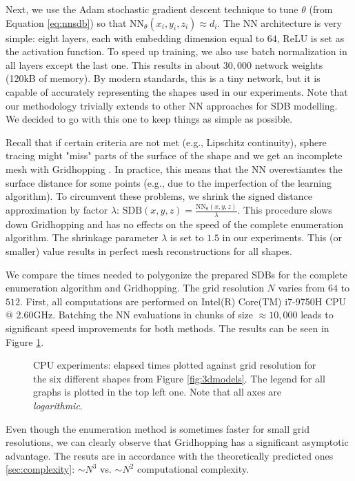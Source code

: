 \documentclass[11pt,twocolumn]{article}
\begin{document}
		Next, we use the Adam stochastic gradient descent technique to tune $\theta$ (from Equation \ref{eq:nnsdb}) so that $\text{NN}_\theta(x_i, y_i, z_i)\approx d_i$.
		The NN architecture is very simple: eight layers, each with embedding dimension equal to $64$, ReLU is set as the activation function.
		To speed up training, we also use batch normalization in all layers except the last one.
		This results in about $30,000$ network weights (120kB of memory).
		By modern standards, this is a tiny network, but it is capable of accurately representing the shapes used in our experiments.
		Note that our methodology trivially extends to other NN approaches for SDB modelling.
		We decided to go with this one to keep things as simple as possible.

		Recall that if certain criteria are not met (e.g., Lipschitz continuity),
		sphere tracing might "miss" parts of the surface of the shape and we get an incomplete mesh with Gridhopping \cite{Hart94spheretracing}.
		In practice, this means that the NN overestiamtes the surface distance for some points
		(e.g., due to the imperfection of the learning algorithm).
		To circumvent these problems, we shrink the signed distance approximation by factor $\lambda$: $\text{SDB}(x, y, z)=\frac{\text{NN}_\theta(x, y, z)}{\lambda}$.
		This procedure slows down Gridhopping and has no effects on the speed of the complete enumeration algorithm.
		The shrinkage parameter $\lambda$ is set to $1.5$ in our experiments.
		This (or smaller) value results in perfect mesh reconstructions for all shapes.

		We compare the times needed to polygonize the prepared SDBs for the complete enumeration algorithm and Gridhopping.
		The grid resolution $N$ varies from $64$ to $512$.
		First, all computations are performed on Intel(R) Core(TM) i7-9750H CPU @ 2.60GHz.
		Batching the NN evaluations in chunks of size $\approx 10,000$ leads to significant speed improvements for both methods.
		The results can be seen in Figure \ref{fig:nnsdb-times-cpu}.
		\begin{figure}
			\centering
			\resizebox{1.0\textwidth}{!}
			{
			
			}
			\resizebox{1.0\textwidth}{!}
			{
			
			}
			\caption
			{
				CPU experiments: elapsed times plotted against grid resolution for the six different shapes from Figure \ref{fig:3dmodels}.
				The legend for all graphs is plotted in the top left one.
				Note that all axes are \textit{logarithmic}.
			}
			\label{fig:nnsdb-times-cpu}
		\end{figure}
		Even though the enumeration method is sometimes faster for small grid resolutions, we can clearly observe that Gridhopping has a significant asymptotic advantage.
		The resuts are in accordance with the theoretically predicted ones \ref{sec:complexity}: $\sim N^3$ vs. $\sim N^2$ computational complexity.
\end{document}
